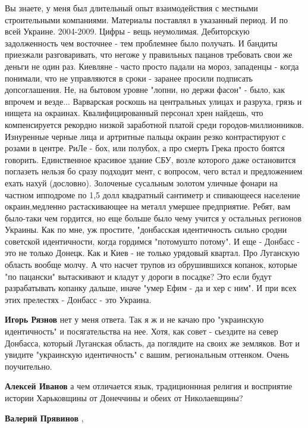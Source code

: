 \begin{itemize}
\begin{itemize}
Вы знаете, у меня был длительный опыт взаимодействия с местными строительными
компаниями. Материалы поставлял в указанный период. И по всей Украине.
2004-2009. Цифры - вещь неумолимая. Дебиторскую задолженность чем восточнее -
тем проблемнее было получать. И бандиты приезжали разговаривать, что негоже у
правильных пацанов требовать свои же деньги не один раз. Киевляне - часто
просто падали на мороз, западенцы - когда понимали, что не управляются в сроки
- заранее просили подписать допсоглашения. Не, на бытовом уровне "лопни, но
держи фасон" - было, как впрочем и везде... Варварская роскошь на центральных
улицах и разруха, грязь и нищета на окраинах. Квалифицированный персонал хрен
найдешь, что компенсируется рекордно низкой заработной платой среди
городов-миллионников. Изнуренные черные лица и артритные пальцы окраин резко
контрастируют с розами в центре. РиЛе - бох, или полубох, а про смерть Грека
просто боятся говорить. Единственное красивое здание СБУ, возле которого даже
остановится поглазеть нельзя бо сразу подходит мент, с вопросом, чего встал и
предложением ехать нахуй (дословно). Золоченые сусальным золотом уличные фонари
на частном ипподроме по 1,5 долл квадратный сантиметр и спивающееся население
окраин,медленно растаскивающее на металл умершее предприятие. Ребят, вам
было-таки чем гордится, но еще больше было чему учится у остальных регионов
Украины. Как по мне, уж простите, "донбасская идентичность сильно сродни
советской идентичности, когда гордимся "потомушто потому". И еще - Донбасс -
это не только Донецк. Как и Киев - не только урядовый квартал. Про Луганскую
область вообще молчу. А что насчет трупов из обрушившихся копанок, которые "по
пацански" вытаскивают и кладут у дороги в посадке? Это если будут разрабатывать
копанку дальше, иначе "умер Ефим - да и хер с ним". И при всех этих прелестях -
Донбасс - это Украина.

\textbf{Игорь Рязнов} нет у меня ответа. Так я ж и не качаю про "украинскую идентичность" и посягательства на нее. Хотя, как совет - сьездите на север Донбасса, который Луганская область, да поглядите на своих же земляков. Вот и увидите "украинскую идентичность" с вашим, региональным оттенком. Очень поучительно.

\textbf{Алексей Иванов} а чем отличается язык, традиционнная религия и восприятие истории Харьковщины от Донеччины и обеих от Николаевщины?

\textbf{Валерий Прявинов} , 


\end{itemize}
\end{itemize}
